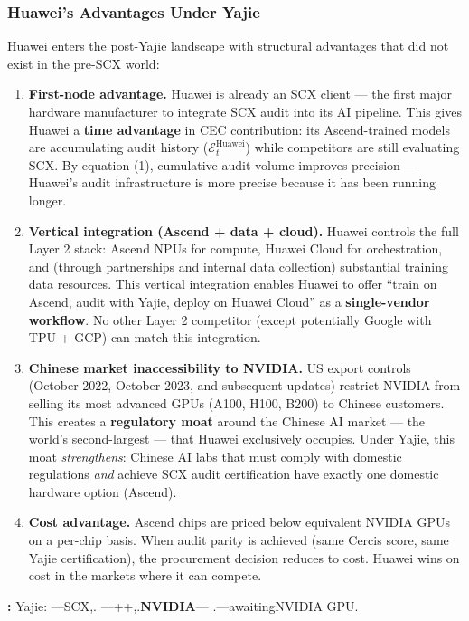 \documentclass[12pt,a4paper]{article}
\theoremstyle{remark}
\begin{document}
\subsubsection{Huawei's Advantages Under Yajie}
Huawei enters the post-Yajie landscape with structural advantages that did 
not exist in the pre-SCX world:
\begin{enumerate}[label=(\arabic*), leftmargin=*]
 \item \textbf{First-node advantage.} Huawei is already an SCX client --- 
 the first major hardware manufacturer to integrate SCX audit 
 into its AI pipeline. This gives Huawei a \textbf{time advantage} 
 in CEC contribution: its Ascend-trained models are accumulating 
 audit history ($\mathcal{E}_t^{\text{Huawei}}$) while 
 competitors are still evaluating SCX. By equation (1), 
 cumulative audit volume improves precision --- Huawei's audit 
 infrastructure is more precise because it has been running longer.
 \item \textbf{Vertical integration (Ascend + data + cloud).} Huawei 
 controls the full Layer 2 stack: Ascend NPUs for compute, 
 Huawei Cloud for orchestration, and (through partnerships and 
 internal data collection) substantial training data resources. 
 This vertical integration enables Huawei to offer ``train on 
 Ascend, audit with Yajie, deploy on Huawei Cloud'' as a 
 \textbf{single-vendor workflow}. No other Layer 2 competitor 
 (except potentially Google with TPU + GCP) can match this 
 integration.
 \item \textbf{Chinese market inaccessibility to NVIDIA.} US export 
 controls (October 2022, October 2023, and subsequent updates) 
 restrict NVIDIA from selling its most advanced GPUs (A100, H100, 
 B200) to Chinese customers. This creates a \textbf{regulatory 
 moat} around the Chinese AI market --- the world's second-largest 
 --- that Huawei exclusively occupies. Under Yajie, this moat 
 \textit{strengthens}: Chinese AI labs that must comply with 
 domestic regulations \textit{and} achieve SCX audit certification 
 have exactly one domestic hardware option (Ascend).
 \item \textbf{Cost advantage.} Ascend chips are priced below equivalent 
 NVIDIA GPUs on a per-chip basis. When audit parity is achieved 
 (same Cercis score, same Yajie certification), the procurement 
 decision reduces to cost. Huawei wins on cost in the markets 
 where it can compete.
\end{enumerate}
\noindent\textbf{: }
Yajie: ---SCX,.
---++,.\textbf{NVIDIA}---
.---awaitingNVIDIA GPU.
\end{document}

